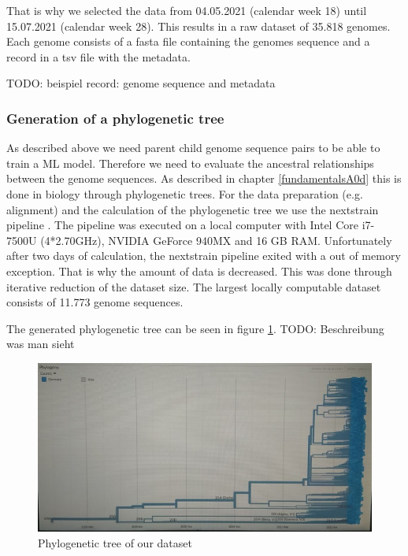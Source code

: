 That is why we selected the data from 04.05.2021 (calendar week 18) until 15.07.2021 (calendar week 28). This results in a raw dataset of 35.818 genomes.
Each genome consists of a fasta file containing the genomes sequence and a record in a tsv file with the metadata.

TODO: beispiel record: genome sequence and metadata


\subsubsection{Generation of a phylogenetic tree}
\label{ch:approachAb}

As described above we need parent child genome sequence pairs to be able to train a \ac{ML} model. Therefore we need to evaluate the ancestral relationships between the genome sequences.
As described in chapter \ref{fundamentalsA0d} this is done in biology through phylogenetic trees.
For the data preparation (e.g. alignment) and the calculation of the phylogenetic tree we use the nextstrain pipeline \cite{10.1093/bioinformatics/bty407}.
The pipeline was executed on a local computer with Intel Core i7-7500U (4*2.70GHz), NVIDIA GeForce 940MX and 16 GB RAM.
Unfortunately after two days of calculation, the nextstrain pipeline exited with a out of memory exception. That is why the amount of data is decreased. This was done through iterative reduction of the dataset size. The largest locally computable dataset consists of 11.773 genome sequences.

The generated phylogenetic tree can be seen in figure \ref{phylogeneticTree}.
TODO: Beschreibung was man sieht

\begin{figure}[ht]
	\centering
	\includegraphics[width=1.0\linewidth]{figures/phylogeneticTree.jpg}
	\caption{Phylogenetic tree of our dataset \cite{own representation}}
	\label{phylogeneticTree}
\end{figure}

